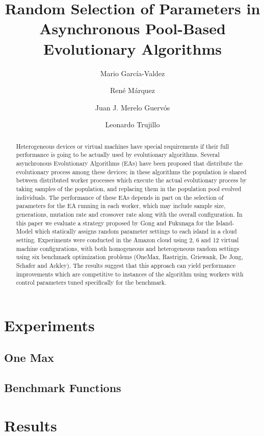 \documentclass{llncs}
\begin{document}
\sloppy

\title{Random Selection of Parameters in Asynchronous Pool-Based Evolutionary Algorithms}

\author{Mario Garc\'ia-Valdez \and Ren\'e M\'arquez \and Juan J. Merelo Guerv\'os \and  Leonardo Trujillo }


\maketitle

\begin{abstract}
Heterogeneous devices or virtual machines have special requirements if
their full performance is going to be actually used by evolutionary
algorithms. Several asynchronous Evolutionary Algorithms (EAs) have
been proposed that distribute the evolutionary process among these
devices; in these algorithms the population is shared between
distributed worker processes which execute the actual evolutionary
process by taking samples of the population, and replacing them in the
population pool evolved individuals. The performance of these EAs
depends in part on the selection of parameters for the EA running in
each worker, which may include sample size, generations, mutation rate
and crossover rate along with the overall configuration. In this paper
we evaluate a strategy proposed by Gong and Fukunaga for the
Island-Model which statically assigns random parameter settings to
each island in a cloud setting. Experiments were conducted in the
Amazon cloud using 2, 6 and 12 virtual machine configurations, with
both homogeneous and heterogeneous random settings using six benchmark
optimization problems (OneMax, Rastrigin, Griewank, De Jong, Schafer
and Ackley). The results suggest that this approach can yield
performance improvements which are competitive to instances of the
algorithm using workers with control parameters tuned specifically for
the benchmark.

\end{abstract}

\section{Experiments}
\subsection{One Max}

\subsection{Benchmark Functions}
\section{Results}
\end{document}
